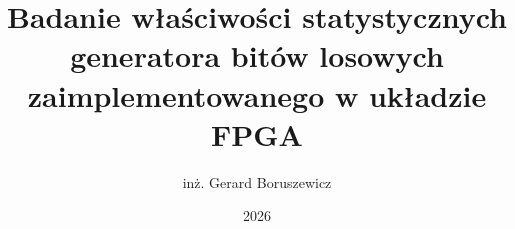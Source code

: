 \documentclass[thesis=mgr,faculty=ee]{EE-dyplom}
\title{Badanie właściwości statystycznych generatora bitów losowych zaimplementowanego w układzie FPGA}
\author{inż. Gerard Boruszewicz}
\date{2026}
\begin{document}
    \frontpages
    

	
    
    
	
    
	

    \bibliografia

    
    \listoffigures
    \listoftables
\end{document}
